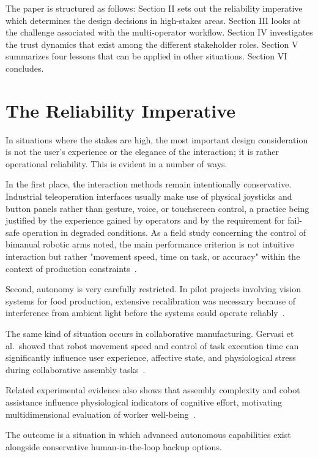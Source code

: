 \documentclass[sigconf, nonacm] {acmart}
\begin{document}
The paper is structured as follows: Section II sets out the reliability imperative which determines the design decisions in high-stakes areas. Section III looks at the challenge associated with the multi-operator workflow. Section IV investigates the trust dynamics that exist among the different stakeholder roles. Section V summarizes four lessons that can be applied in other situations. Section VI concludes.

\section{The Reliability Imperative}
In situations where the stakes are high, the most important design consideration is not the user's experience or the elegance of the interaction; it is rather operational reliability. This is evident in a number of ways.

In the first place, the interaction methods remain intentionally conservative. Industrial teleoperation interfaces usually make use of physical joysticks and button panels rather than gesture, voice, or touchscreen control, a practice being justified by the experience gained by operators and by the requirement for fail-safe operation in degraded conditions. As a field study concerning the control of bimanual robotic arms noted, the main performance criterion is not intuitive interaction but rather "movement speed, time on task, or accuracy" within the context of production constraints~\cite{Dreger02062024}.

Second, autonomy is very carefully restricted. In pilot projects involving vision systems for food production, extensive recalibration was necessary because of interference from ambient light before the systems could operate reliably~\cite{hartu2025field}. 

The same kind of situation occurs in collaborative manufacturing. Gervasi et al.\ showed that robot movement speed and control of task execution time can significantly influence user experience, affective state, and physiological stress during collaborative assembly tasks~\cite{Gervasi2022}. 

Related experimental evidence also shows that assembly complexity and cobot assistance influence physiological indicators
of cognitive effort, motivating multidimensional evaluation of worker well-being~\cite{CAPPONI2024102789}.

The outcome is a situation in which advanced autonomous capabilities exist alongside conservative human-in-the-loop backup options.
\end{document}
